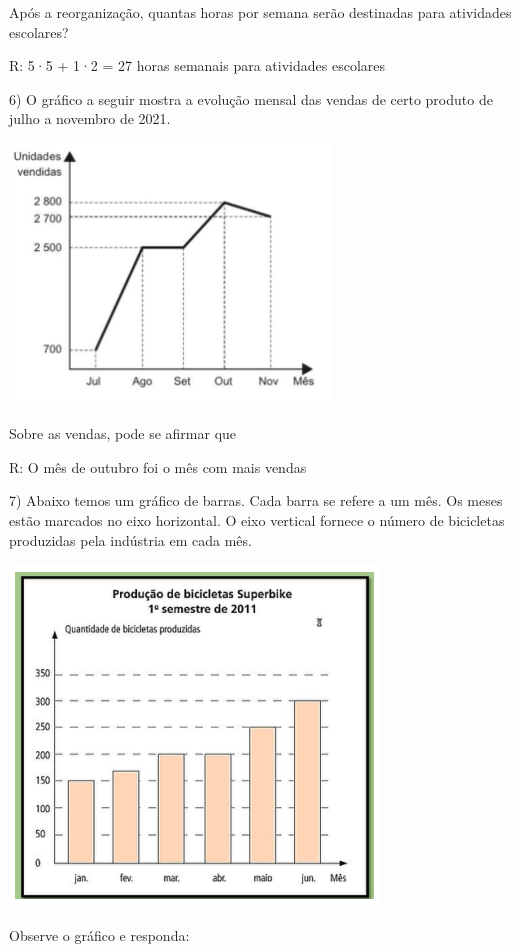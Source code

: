 Após a reorganização, quantas horas por semana serão destinadas para
atividades escolares?

R: 5·5 + 1·2 = 27 horas semanais para atividades escolares

6) O gráfico a seguir mostra a evolução mensal das vendas de certo
produto de julho a novembro de 2021.

\includegraphics[width=3.36458in,height=2.73558in]{./imgSAEB_6_MAT/media/image84.png}

Sobre as vendas, pode se afirmar que

R: O mês de outubro foi o mês com mais vendas

7) Abaixo temos um gráfico de barras. Cada barra se refere a um mês. Os
meses estão marcados no eixo horizontal. O eixo vertical fornece o
número de bicicletas produzidas pela indústria em cada mês.

\includegraphics[width=3.875in,height=3.57292in]{./imgSAEB_6_MAT/media/image85.png}

Observe o gráfico e responda:

